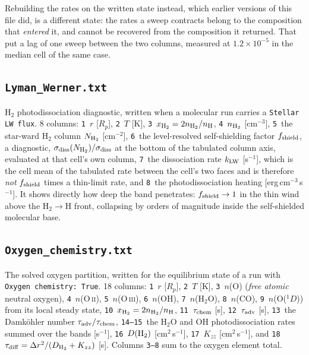 \documentclass[english,a4paper]{my_memo}
\newcommand{\rp}{\ensuremath{R_p}}   %
\begin{document}
Rebuilding the rates on the written state instead, which earlier versions of
this file did, is a different state: the rates a sweep contracts belong to the
composition that \emph{entered} it, and cannot be recovered from the
composition it returned. That put a lag of one sweep between the two columns,
measured at $1.2\times10^{-5}$ in the median cell of the same case.

\subsection{\texttt{Lyman\_Werner.txt}}
H$_2$ photodissociation diagnostic, written when a molecular run carries a
\texttt{Stellar LW flux}. 8 columns: \texttt{1}~$r$ [\rp], \texttt{2}~$T$ [K],
\texttt{3}~$x_{\rm H_2}=2n_{\rm H_2}/n_{\rm H}$, \texttt{4}~$n_{\rm H_2}$
[cm$^{-3}$], \texttt{5}~the star-ward H$_2$ column $N_{\rm H_2}$ [cm$^{-2}$],
\texttt{6}~the level-resolved self-shielding factor $f_{\rm shield}$,
a diagnostic, $\sigma_{\rm diss}(N_{\rm H_2})/\sigma_{\rm diss}$ at the
bottom of the tabulated column axis, evaluated at that cell's own column,
\texttt{7}~the dissociation rate $k_{\rm LW}$ [s$^{-1}$], which is the cell
mean of the tabulated rate between the cell's two faces and is therefore
\emph{not} $f_{\rm shield}$ times a thin-limit rate, and
\texttt{8}~the photodissociation heating [erg\,cm$^{-3}$\,s$^{-1}$]. It shows
directly how deep the band penetrates: $f_{\rm shield}\to1$ in the thin wind
above the H$_2\to$H front, collapsing by orders of magnitude inside the
self-shielded molecular base.

\subsection{\texttt{Oxygen\_chemistry.txt}}
The solved oxygen partition, written for the equilibrium state of a run with
\texttt{Oxygen chemistry: True}. 18 columns: \texttt{1}~$r$ [\rp],
\texttt{2}~$T$ [K], \texttt{3}~$n$(O) (\emph{free atomic} neutral oxygen),
\texttt{4}~$n$(O\,\textsc{ii}), \texttt{5}~$n$(O\,\textsc{iii}),
\texttt{6}~$n$(OH), \texttt{7}~$n$(H$_2$O), \texttt{8}~$n$(CO),
\texttt{9}~$n$(O($^1D$)) from its local steady state, \texttt{10}~$x_{\rm H_2}
= 2n_{\rm H_2}/n_{\rm H}$, \texttt{11}~$\tau_{\rm chem}$ [s],
\texttt{12}~$\tau_{\rm adv}$ [s], \texttt{13}~the Damk\"ohler number
$\tau_{\rm adv}/\tau_{\rm chem}$, \texttt{14--15}~the H$_2$O and OH
photodissociation rates summed over the bands [s$^{-1}$],
\texttt{16}~$D({\rm H_2})$ [cm$^2$\,s$^{-1}$], \texttt{17}~$K_{zz}$
[cm$^2$\,s$^{-1}$], and \texttt{18}~$\tau_{\rm diff} = \Delta r^2/(D_{\rm H_2}
+ K_{zz})$ [s]. Columns \texttt{3--8} sum to the oxygen element total.
\end{document}
